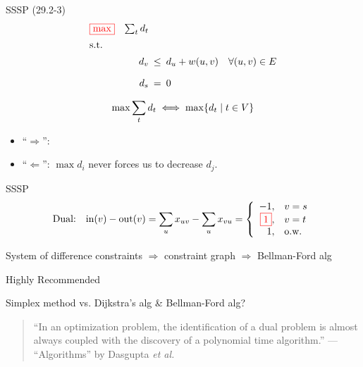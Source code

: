 \begin{frame}{SSSP (29.2-3)}
  \begin{equation*}
	\setlength\arraycolsep{2.5pt}
	\begin{array}{l@{\quad}rcl}
	  \color{red}{\boxed{\max}} 	& \sum_{t} d_t	& &	\\[5pt]
	  \text{s.t.} 	& &	\\[5pt]
			& d_v   &\leq& d_u + w(u,v) \quad \forall (u,v) \in E	\\[10pt]
			& d_s	&=& 0 
	\end{array}
  \end{equation*}

  \vspace{0.60cm}

  \[
	\max \sum_{t} d_t \iff \max \{d_t \mid t \in V\}
  \]

  \begin{Proof}
	\begin{itemize}
	  \item ``$\Rightarrow$'':
	  \item ``$\Leftarrow$'': $\max d_i$ never forces us to decrease $d_j$.
	\end{itemize}
  \end{Proof}
\end{frame}
\begin{frame}{SSSP}
  \[
	\text{Dual:}\quad 
	\text{in}(v) - \text{out}(v) 
	=	\sum_{u} x_{uv} - \sum_{u} x_{vu} 
	 = \left\{\begin{array}{rl}
	  -1,	&	v = s	\\
	  \textcolor{red}{\boxed{1}},	&	v = t	\\
	  1,	&	\text{o.w.}
	\end{array}\right.
  \]
	
  \begin{center}
	System of difference constraints $\Rightarrow$ constraint graph $\Rightarrow$ Bellman-Ford alg
  \end{center}

  \begin{alertblock}{Highly Recommended}
	\begin{center}
	  Simplex method vs. Dijkstra's alg \& Bellman-Ford alg?
	\end{center}
  \end{alertblock}

  \vspace{0.50cm}
  \begin{quote}
	``In an optimization problem, the identification of a dual problem 
	is almost always coupled with the discovery of a polynomial time algorithm.''
	\hfill --- ``Algorithms'' by Dasgupta \emph{et al.}
  \end{quote}
\end{frame}
